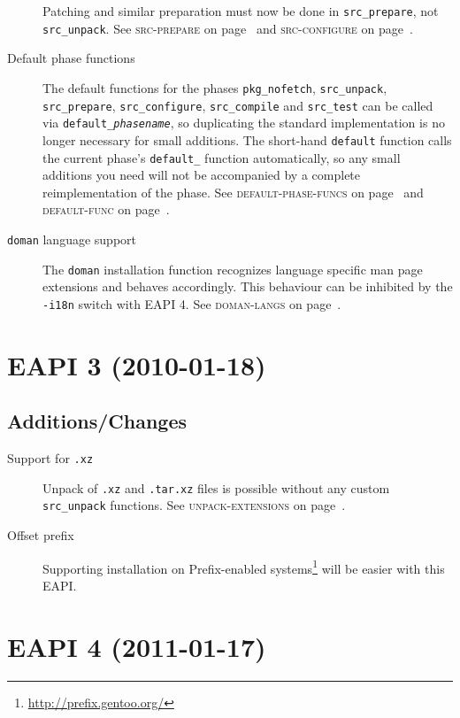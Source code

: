 \documentclass[a4paper]{leaflet}
\newcommand{\code}[1]{\texttt{#1}}
\newcommand{\featureref}[1]{\textsc{#1} on page~\pageref{feat:#1}}
\begin{document}
\begin{description}
    Patching and similar preparation must now be done in
    \code{src\_prepare}, not \code{src\_unpack}.  See
    \featureref{src-prepare} and \featureref{src-configure}.
    \item[Default phase functions] The default functions for the
    phases \code{pkg\_nofetch}, \code{src\_unpack},
    \code{src\_prepare}, \code{src\_configure}, \code{src\_compile}
    and \code{src\_test} can be called via
    \code{default\_\emph{phasename}}, so duplicating the standard
    implementation is no longer necessary for small additions.  The
    short-hand \code{default} function calls the current phase's
    \code{default\_} function automatically, so any small additions
    you need will not be accompanied by a complete reimplementation of
    the phase.  See \featureref{default-phase-funcs} and
    \featureref{default-func}.
    \item[\code{doman} language support] The \code{doman} installation
    function recognizes language specific man page extensions and
    behaves accordingly.  This behaviour can be inhibited by the
    \code{-i18n} switch with EAPI 4.  See \featureref{doman-langs}.
\end{description}
\newpage

\section{EAPI 3 (2010-01-18)}
\label{sec:cs:eapi3}
\subsection{Additions/Changes}
\label{sec:cs:eapi3-additions}
\begin{description}
    \item[Support for \code{.xz}] Unpack of \code{.xz} and
    \code{.tar.xz} files is possible without any custom
    \code{src\_unpack} functions.  See \featureref{unpack-extensions}.
    \item[Offset prefix] Supporting installation on Prefix-enabled
    systems\footnote{\url{http://prefix.gentoo.org/}} will be easier
    with this EAPI.
\end{description}

\section{EAPI 4 (2011-01-17)}
\label{sec:cs:eapi4}
\end{document}

